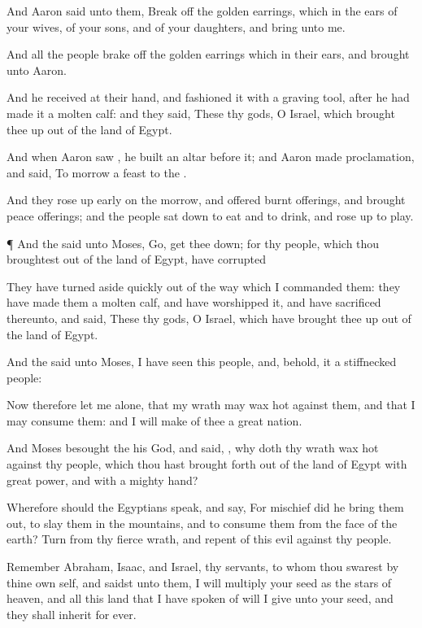 {And
Aaron
said unto them, Break
off the
golden
earrings, which
{} in the
ears of your
wives, of your
sons, and of your
daughters, and
bring
{} unto me.

And all the
people brake
off the
golden
earrings which
{} in their
ears, and
brought
{} unto
Aaron.

And he
received
{} at their
hand, and
fashioned it with a graving
tool, after he had
made it a
molten
calf: and they
said, These
{} thy
gods, O
Israel, which
brought thee up out of the
land of
Egypt.

And when
Aaron
saw
{}, he
built an
altar
before it; and
Aaron made
proclamation, and
said, To
morrow
{} a
feast to the
{}.

And they rose up
early on the
morrow, and
offered burnt
offerings, and
brought peace
offerings; and the
people
sat down to
eat and to
drink, and rose
up to
play.


\par }{\PP {}¶ And the
{}
said unto
Moses,
Go, get thee
down; for thy
people, which thou
broughtest out of the
land of
Egypt, have
corrupted
{}

They have
turned aside
quickly out of the
way which I
commanded them: they have
made them a
molten
calf, and have
worshipped it, and have
sacrificed thereunto, and
said, These
{} thy
gods, O
Israel, which have brought thee
up out of the
land of
Egypt.

And the
{}
said unto
Moses, I have
seen this
people, and, behold, it
{} a
stiffnecked
people:

Now therefore let me
alone, that my
wrath may wax
hot against them, and that I may
consume them: and I will
make of thee a
great
nation.

And
Moses
besought the
{} his
God, and
said,
{}, why doth thy
wrath wax
hot against thy
people, which thou hast brought
forth out of the
land of
Egypt with
great
power, and with a
mighty
hand?

Wherefore should the
Egyptians
speak, and
say, For
mischief did he
bring them out, to
slay them in the
mountains, and to
consume them from the
face of the
earth?
Turn from thy
fierce
wrath, and
repent of this
evil against thy
people.

Remember
Abraham,
Isaac, and
Israel, thy
servants, to whom thou
swarest by thine own self, and
saidst unto them, I will
multiply your
seed as the
stars of
heaven, and all this
land that I have
spoken of will I
give unto your
seed, and they shall
inherit
{} for
ever.

}
